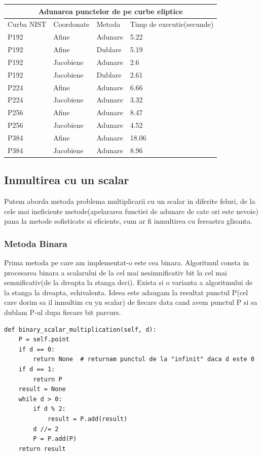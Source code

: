 \begin{tabular}{ |p{3cm}||p{3cm}|p{3cm}|p{3cm}|  }
 \hline
 \multicolumn{4}{|c|}{Adunarea punctelor de pe curbe eliptice} \\
 \hline
 Curba NIST& Coordonate &Metoda &Timp de executie(secunde)\\
 \hline
 P192   & Afine    &Adunare& 5.22\\
 P192&Afine  & Dublare & 5.19\\
 P192 &Jacobiene & Adunare& 2.6\\
 P192&Jacobiene & Dublare & 2.61\\
 P224& Afine & Adunare & 6.66\\
 P224& Jacobiene & Adunare   &3.32\\
 P256& Afine  & Adunare& 8.47\\
 P256& Jacobiene  & Adunare& 4.52\\
 P384& Afine  & Adunare& 18.06\\
 P384& Jacobiene  & Adunare& 8.96\\
 \hline
\end{tabular}

\subsection{Inmultirea cu un scalar}
\label{subsec:subsec03}


Putem aborda metoda problema multiplicarii cu un scalar in diferite feluri, de la cele mai ineficiente metode(apelararea functiei de adunare de cate ori este nevoie) pana la metode sofisticate si eficiente, cum ar fi inmultirea cu fereastra glisanta.

\subsubsection{Metoda Binara}

Prima metoda pe care am implementat-o este cea binara. Algoritmul consta in procesarea binara a scalarului de la cel mai nesimnificativ bit la cel mai semnificativ(de la dreapta la stanga deci). Exista si o varianta a algoritmului de la stanga la dreapta, echivalenta. Ideea este adaugam la resultat punctul P(cel care dorim sa il inmultim cu yn scalar) de fiecare data cand avem punctul P si sa dublam P-ul dupa fiecare bit parcurs.

\begin{lstlisting}
def binary_scalar_multiplication(self, d):
    P = self.point
    if d == 0:
        return None  # returnam punctul de la "infinit" daca d este 0
    if d == 1:
        return P
    result = None
    while d > 0:
        if d % 2:
            result = P.add(result)
        d //= 2
        P = P.add(P)
    return result
\end{lstlisting}

